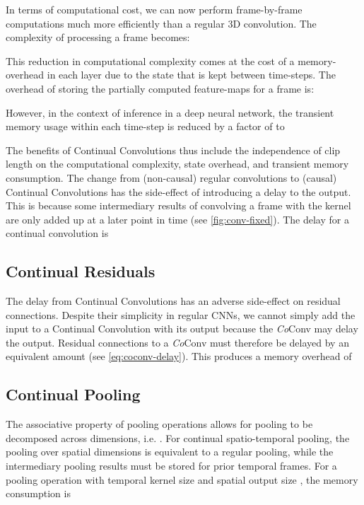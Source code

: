 \documentclass[runningheads]{llncs}
\begin{document}
In terms of computational cost, we can now perform frame-by-frame computations much more efficiently than a regular 3D convolution. The complexity of processing a frame becomes:

This reduction in computational complexity comes at the cost of a memory-overhead in each layer due to the state that is kept between time-steps. 
The overhead of storing the partially computed feature-maps for a frame is:

However, in the context of inference in a deep neural network, the transient memory usage within each time-step is reduced by a factor of  to


The benefits of Continual Convolutions thus include the independence of clip length on the computational complexity, state overhead, and transient memory consumption.
The change from (non-causal) regular convolutions to (causal) Continual Convolutions has the side-effect of introducing a delay to the output. 
This is because some intermediary results of convolving a frame with the kernel are only added up at a later point in time (see \cref{fig:conv-fixed}). 
The delay for a continual convolution is



\subsection{Continual Residuals} \label{sec:residual}
The delay from Continual Convolutions has an adverse side-effect on residual connections. 
Despite their simplicity in regular CNNs, we cannot simply add the input to a Continual Convolution with its output because the \textit{Co}Conv may delay the output.
Residual connections to a \textit{Co}Conv must therefore be delayed by an equivalent amount (see \cref{eq:coconv-delay}).
This produces a memory overhead of 



\vspace{-3mm}
\subsection{Continual Pooling}  \label{sec:pooling}
\vspace{-1mm}
The associative property of pooling operations allows for pooling to be decomposed across dimensions, i.e. .
For continual spatio-temporal pooling, the pooling over spatial dimensions is equivalent to a regular pooling, while the intermediary pooling results must be stored for prior temporal frames. For a pooling operation with temporal kernel size  and spatial output size , the memory consumption is
\end{document}
